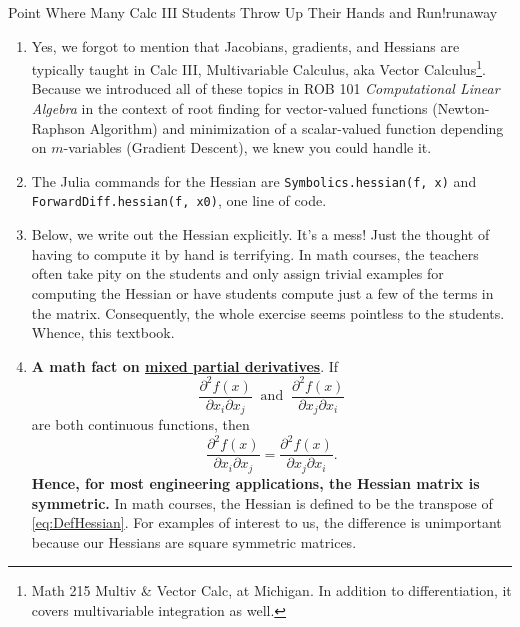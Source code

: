 \begin{funColor}{Point Where Many Calc III Students Throw Up Their Hands and Run!}{runaway}
\begin{enumerate}
\renewcommand{\labelenumi}{(\alph{enumi})}
\setlength{\itemsep}{.2cm}
    \item Yes, we forgot to mention that Jacobians, gradients, and Hessians are typically taught in Calc III, Multivariable Calculus, aka Vector Calculus\footnote{Math 215 Multiv \& Vector Calc, at Michigan. In addition to differentiation, it covers multivariable integration as well.}. Because we introduced all of these topics in ROB 101 \textit{Computational Linear Algebra} in the context of root finding for vector-valued functions (Newton-Raphson Algorithm) and minimization of a scalar-valued function depending on $m$-variables (Gradient Descent), we knew you could handle it.
    \item The Julia commands for the Hessian are \texttt{Symbolics.hessian(f, x)} and \texttt{ForwardDiff.hessian(f, x0)}, one line of code. 
    \item Below, we write out the Hessian explicitly. It's a mess! Just the thought of having to compute it by hand is terrifying. In math courses, the teachers often take pity on the students and only assign trivial examples for computing the Hessian or have students compute just a few of the terms in the matrix. Consequently, the whole exercise seems pointless to the students. Whence, this textbook.
    \item \textbf{A math fact on \href{https://en.wikipedia.org/wiki/Symmetry_of_second_derivatives}{mixed partial derivatives}}. If 
    $$ \frac{\partial^2 f(x)}{\partial x_i \partial x_j} ~ \text{ and }~ \frac{\partial^2 f(x)}{\partial x_j \partial x_i}$$
    are both continuous functions, then
      $$ \frac{\partial^2 f(x)}{\partial x_i \partial x_j} = \frac{\partial^2 f(x)}{\partial x_j \partial x_i}.$$ \textbf{Hence, for most engineering applications, the Hessian matrix is symmetric.} In math courses, the Hessian is defined to be the transpose of \eqref{eq:DefHessian}. For examples of interest to us, the difference is unimportant because our Hessians are square symmetric matrices.
\end{enumerate}

    
\end{funColor}



 \vspace*{.2cm}

